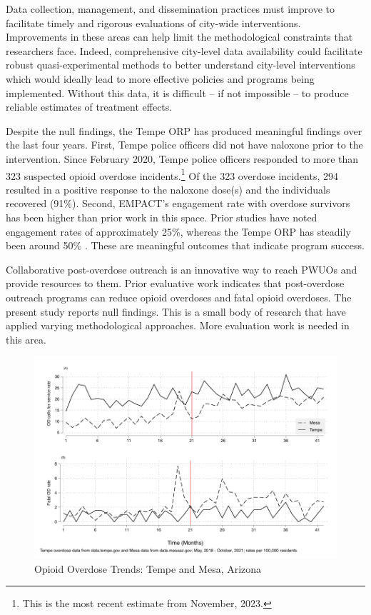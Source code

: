 Data collection, management, and dissemination practices must improve to facilitate timely and rigorous evaluations of city-wide interventions. Improvements in these areas can help limit the methodological constraints that researchers face. Indeed, comprehensive city-level data availability could facilitate robust quasi-experimental methods to better understand city-level interventions which would ideally lead to more effective policies and programs being implemented. Without this data, it is difficult -- if not impossible -- to produce reliable estimates of treatment effects.

Despite the null findings, the Tempe ORP has produced meaningful findings over the last four years. First, Tempe police officers did not have naloxone prior to the intervention. Since February 2020, Tempe police officers responded to more than 323 suspected opioid overdose incidents.\footnote{This is the most recent estimate from November, 2023.} Of the 323 overdose incidents, 294 resulted in a positive response to the naloxone dose(s) and the individuals recovered (91\%). Second, EMPACT's engagement rate with overdose survivors has been higher than prior work in this space. Prior studies have noted engagement rates of approximately 25\%, whereas the Tempe ORP has steadily been around 50\% \parencite{dahlem_recovery_2021, wagner_training_2016, watts_tempe_2023, white_moving_2021}. These are meaningful outcomes that indicate program success. 

Collaborative post-overdose outreach is an innovative way to reach PWUOs and provide resources to them. Prior evaluative work indicates that post-overdose outreach programs can reduce opioid overdoses and fatal opioid overdoses. The present study reports null findings. This is a small body of research that have applied varying methodological approaches. More evaluation work is needed in this area. 

\pagebreak



\newpage

\begin{figure}
    \caption{\centering Opioid Overdose Trends: Tempe and Mesa, Arizona}
    \includegraphics{figures/rates_combined.pdf}
\end{figure}

